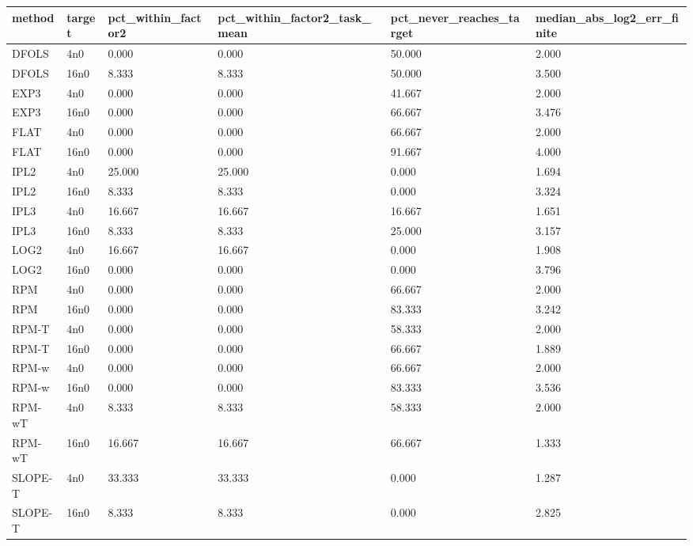\begin{tabular}{llllll}
\hline
method & target & pct\_within\_factor2 & pct\_within\_factor2\_task\_mean & pct\_never\_reaches\_target & median\_abs\_log2\_err\_finite \\
\hline
DFOLS & 4n0 & 0.000 & 0.000 & 50.000 & 2.000 \\
DFOLS & 16n0 & 8.333 & 8.333 & 50.000 & 3.500 \\
EXP3 & 4n0 & 0.000 & 0.000 & 41.667 & 2.000 \\
EXP3 & 16n0 & 0.000 & 0.000 & 66.667 & 3.476 \\
FLAT & 4n0 & 0.000 & 0.000 & 66.667 & 2.000 \\
FLAT & 16n0 & 0.000 & 0.000 & 91.667 & 4.000 \\
IPL2 & 4n0 & 25.000 & 25.000 & 0.000 & 1.694 \\
IPL2 & 16n0 & 8.333 & 8.333 & 0.000 & 3.324 \\
IPL3 & 4n0 & 16.667 & 16.667 & 16.667 & 1.651 \\
IPL3 & 16n0 & 8.333 & 8.333 & 25.000 & 3.157 \\
LOG2 & 4n0 & 16.667 & 16.667 & 0.000 & 1.908 \\
LOG2 & 16n0 & 0.000 & 0.000 & 0.000 & 3.796 \\
RPM & 4n0 & 0.000 & 0.000 & 66.667 & 2.000 \\
RPM & 16n0 & 0.000 & 0.000 & 83.333 & 3.242 \\
RPM-T & 4n0 & 0.000 & 0.000 & 58.333 & 2.000 \\
RPM-T & 16n0 & 0.000 & 0.000 & 66.667 & 1.889 \\
RPM-w & 4n0 & 0.000 & 0.000 & 66.667 & 2.000 \\
RPM-w & 16n0 & 0.000 & 0.000 & 83.333 & 3.536 \\
RPM-wT & 4n0 & 8.333 & 8.333 & 58.333 & 2.000 \\
RPM-wT & 16n0 & 16.667 & 16.667 & 66.667 & 1.333 \\
SLOPE-T & 4n0 & 33.333 & 33.333 & 0.000 & 1.287 \\
SLOPE-T & 16n0 & 8.333 & 8.333 & 0.000 & 2.825 \\
\hline
\end{tabular}
